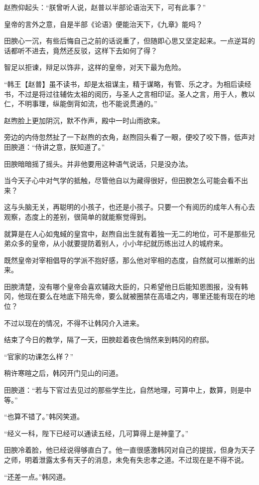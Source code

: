 赵煦仰起头：“朕曾听人说，赵普以半部论语治天下，可有此事？”

皇帝的言外之意，自是半部《论语》便能治天下，《九章》能吗？

田腴心一沉，有些后悔自己之前的话说重了，但随即心思又坚定起来。一点逆耳的话都听不进去，竟然还反驳，这样下去如何了得？

智足以拒谏，辩足以饰非，这样的皇帝，对天下最为危险。

“韩王【赵普】虽不读书，却是太祖谋主，精于谋略，有管、乐之才。为相后读经书，不过是将过往辅佐太祖的阅历，与圣人之言相印证。圣人之言，用于人，教以仁，不明事理，纵能倒背如流，也不能说贯通的。”

赵煦脸上更加阴沉，默不作声，殿中一时山雨欲来。

旁边的内侍忽然扯了一下赵煦的衣角，赵煦回头看了一眼，便咬了咬下唇，低声对田腴道：“侍讲之意，朕知道了。”

田腴暗暗摇了摇头。并非他要用这种语气说话，只是没办法。

当今天子心中对气学的抵触，尽管他自以为藏得很好，但田腴怎么可能会看不出来？

这与头脑无关，再聪明的小孩子，也还是小孩子。只要一个有阅历的成年人有心去观察，态度上的差别，很简单的就能察觉得到。

就算是在人心如鬼蜮的皇宫中，赵煦自出生就有着独一无二的地位，可不是那些兄弟众多的皇帝，从小就要提防着别人，小小年纪就历练出过人的城府来。

既然皇帝对宰相倡导的学派不抱好感，那么他对宰相的态度，自然就可以推断的出来。

田腴清楚，没有哪个皇帝会喜欢辅政大臣的，只希望他日后能知恩图报，没有韩冈，他现在要么在地底下陪先帝，要么就被圈禁在高墙之内，哪里还能有现在的地位？

不过以现在的情况，不得不让韩冈介入进来。

结束了今日的教学，隔了一天，田腴趁着夜色悄然来到韩冈的府邸。

“官家的功课怎么样？”

稍许寒暄之后，韩冈开门见山的问道。

田腴道：“若与下官过去见过的那些学生比，自然地理，可算中上，数算，则是中等。”

“也算不错了。”韩冈笑道。

“经义一科，陛下已经可以通读五经，几可算得上是神童了。”

田腴冷着脸，他已经说得够直白了。他一直很感激韩冈对自己的提拔，但身为天子之师，明着泄露太多有天子的消息，未免有失忠孝之道。不过现在是不得不说。

“还差一点。”韩冈道。

